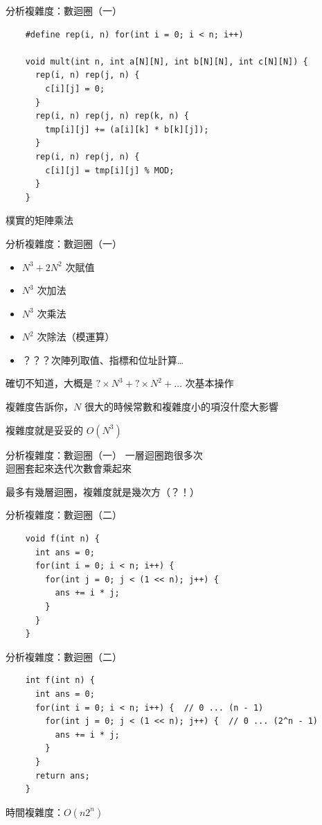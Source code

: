 \documentclass[aspectratio=169]{beamer}
\begin{document}
\begin{frame}[fragile]{分析複雜度：數迴圈（一）}
  \begin{verbatim}
    #define rep(i, n) for(int i = 0; i < n; i++)

    void mult(int n, int a[N][N], int b[N][N], int c[N][N]) {
      rep(i, n) rep(j, n) {
        c[i][j] = 0;
      }
      rep(i, n) rep(j, n) rep(k, n) {
        tmp[i][j] += (a[i][k] * b[k][j]);
      }
      rep(i, n) rep(j, n) {
        c[i][j] = tmp[i][j] % MOD;
      }
    }
  \end{verbatim}

  樸實的矩陣乘法
\end{frame}

\begin{frame}{分析複雜度：數迴圈（一）}
  \begin{itemize}
    \item $N ^ 3 + 2 N ^ 2$ 次賦值
    \item $N ^ 3$ 次加法
    \item $N ^ 3$ 次乘法
    \item $N ^ 2$ 次除法（模運算）
    \item ？？？次陣列取值、指標和位址計算\dots
  \end{itemize}

  確切不知道，大概是 $? \times N^3 + ? \times N^2 + \dots$ 次基本操作

   {
    複雜度告訴你，$N$ 很大的時候常數和複雜度小的項沒什麼大影響

    複雜度就是妥妥的 $O(N^3)$
  }
\end{frame}

\begin{frame}{分析複雜度：數迴圈（一）}
  一層迴圈跑很多次\\
  迴圈套起來迭代次數會乘起來

  最多有幾層迴圈，複雜度就是幾次方（？！）
\end{frame}

\begin{frame}[fragile]{分析複雜度：數迴圈（二）}
  \begin{verbatim}
    void f(int n) {
      int ans = 0;
      for(int i = 0; i < n; i++) {
        for(int j = 0; j < (1 << n); j++) {
          ans += i * j;
        }
      }
    }
  \end{verbatim}
\end{frame}

\begin{frame}[fragile]{分析複雜度：數迴圈（二）}
  \begin{verbatim}
    int f(int n) {
      int ans = 0;
      for(int i = 0; i < n; i++) {  // 0 ... (n - 1)
        for(int j = 0; j < (1 << n); j++) {  // 0 ... (2^n - 1)
          ans += i * j;
        }
      }
      return ans;
    }
  \end{verbatim}

  時間複雜度：$O(n2^n)$
\end{frame}
\end{document}
